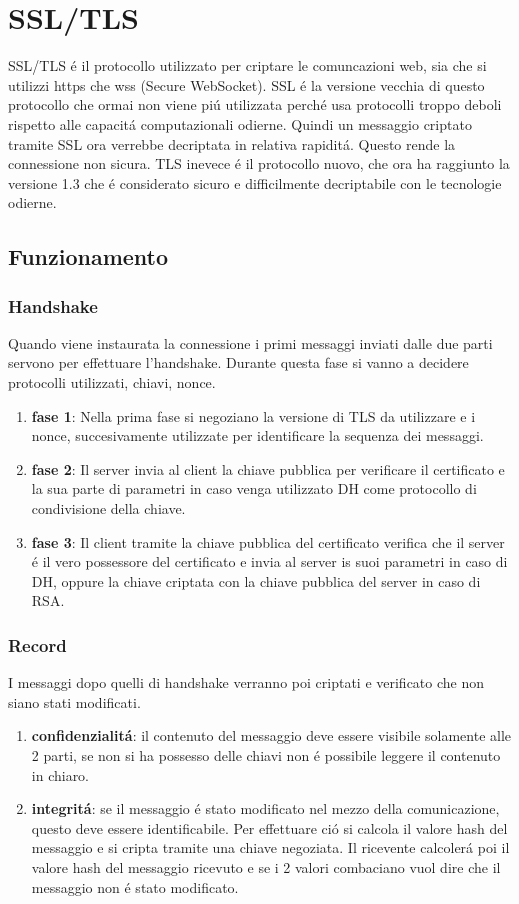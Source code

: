\section{SSL/TLS}
SSL/TLS é il protocollo utilizzato per criptare le comuncazioni web, sia che si utilizzi https che wss (Secure WebSocket). SSL é la versione vecchia di questo protocollo che ormai non viene piú utilizzata perché usa protocolli troppo deboli rispetto alle capacitá computazionali odierne. Quindi un messaggio criptato tramite SSL ora verrebbe decriptata in relativa rapiditá. Questo rende la connessione non sicura. TLS inevece é il protocollo nuovo, che ora ha raggiunto la versione 1.3 che é considerato sicuro e difficilmente decriptabile con le tecnologie odierne.
\subsection{Funzionamento}
\subsubsection{Handshake}
Quando viene instaurata la connessione i primi messaggi inviati dalle due parti servono per effettuare l'handshake. Durante questa fase si vanno a decidere protocolli utilizzati, chiavi, nonce.
\begin{enumerate}
  \item \textbf{fase 1}: Nella prima fase si negoziano la versione di TLS da utilizzare e i nonce, succesivamente utilizzate per identificare la sequenza dei messaggi.
  \item \textbf{fase 2}: Il server invia al client la chiave pubblica per verificare il certificato e la sua parte di parametri in caso venga utilizzato DH come protocollo di condivisione della chiave.
  \item \textbf{fase 3}: Il client tramite la chiave pubblica del certificato verifica che il server é il vero possessore del certificato e invia al server is suoi parametri in caso di DH, oppure la chiave criptata con la chiave pubblica del server in caso di RSA.
\end{enumerate}
\subsubsection{Record}
I messaggi dopo quelli di handshake verranno poi criptati e verificato che non siano stati modificati.
\begin{enumerate}
\item \textbf{confidenzialitá}: il contenuto del messaggio deve essere visibile solamente alle 2 parti, se non si ha possesso delle chiavi non é possibile leggere il contenuto in chiaro.
\item \textbf{integritá}: se il messaggio é stato modificato nel mezzo della comunicazione, questo deve essere identificabile. Per effettuare ció si calcola il valore hash del messaggio e si cripta tramite una chiave negoziata. Il ricevente calcolerá poi il valore hash del messaggio ricevuto e se i 2 valori combaciano vuol dire che il messaggio non é stato modificato.
\end{enumerate}

